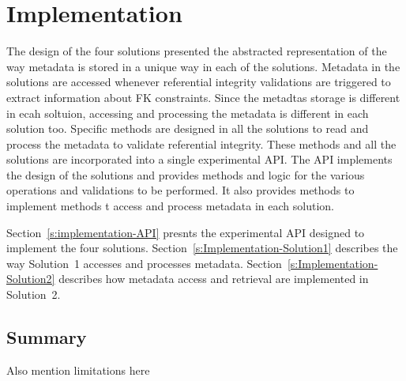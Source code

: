 \chapter{Implementation} \label{c:Implementation}

The design of the four solutions presented the abstracted representation of the
way metadata is stored in a unique way in each of the solutions. Metadata in the
solutions are accessed whenever referential integrity validations are triggered
to extract information about \ac{FK} constraints. Since the metadtas storage is
different in ecah soltuion, accessing and processing the  metadata is different
in each solution too.
Specific methods are designed in all the solutions to read and process the
metadata to validate referential integrity.  These methods and all the solutions
are incorporated into a single experimental \ac{API}. The \ac{API} implements
the design of the solutions and provides methods and logic for the various
operations and validations to be performed. It also provides methods to
implement methods t access and process metadata in each solution.

Section~\ref{s:implementation-API} presnts the experimental \ac{API} designed to
implement the four solutions. Section~\ref{s:Implementation-Solution1} describes
the way Solution~1 accesses and processes metadata.
Section~\ref{s:Implementation-Solution2} describes how metadata access and
retrieval are implemented in Solution~2. 



	




 

  

\section{Summary}\label{s:solutions-summary}
Also mention limitations here

